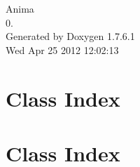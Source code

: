 \documentclass[a4paper]{book}
\begin{document}
\hypersetup{pageanchor=false,citecolor=blue}
\begin{titlepage}
\vspace*{7cm}
\begin{center}
{\Large \-Anima \\[1ex]\large 0. }\\
\vspace*{1cm}
{\large \-Generated by Doxygen 1.7.6.1}\\
\vspace*{0.5cm}
{\small Wed Apr 25 2012 12:02:13}\\
\end{center}
\end{titlepage}
\clearemptydoublepage
{}
\tableofcontents
\clearemptydoublepage
{}
\hypersetup{pageanchor=true,citecolor=blue}
\chapter{\-Class \-Index}

\chapter{\-Class \-Index}

\end{document}
